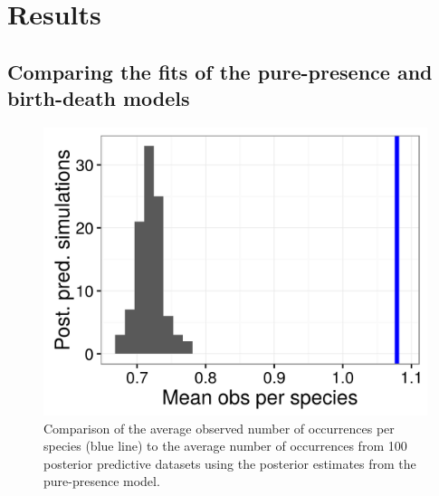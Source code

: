 \documentclass[12pt,letterpaper]{article}
\begin{document}
\section*{Results}

\subsection*{Comparing the fits of the pure-presence and birth-death models}



\begin{figure}[ht]
  \centering
  \includegraphics[width=\textwidth,height=0.4\textheight,keepaspectratio=true]{figure/pred_occ}
  \caption[Posterior predictive check for pure-presence model]{Comparison of the average observed number of occurrences per species (blue line) to the average number of occurrences from 100 posterior predictive datasets using the posterior estimates from the pure-presence model.}
  \label{fig:ppc_pure_presence}
\end{figure}
\end{document}
